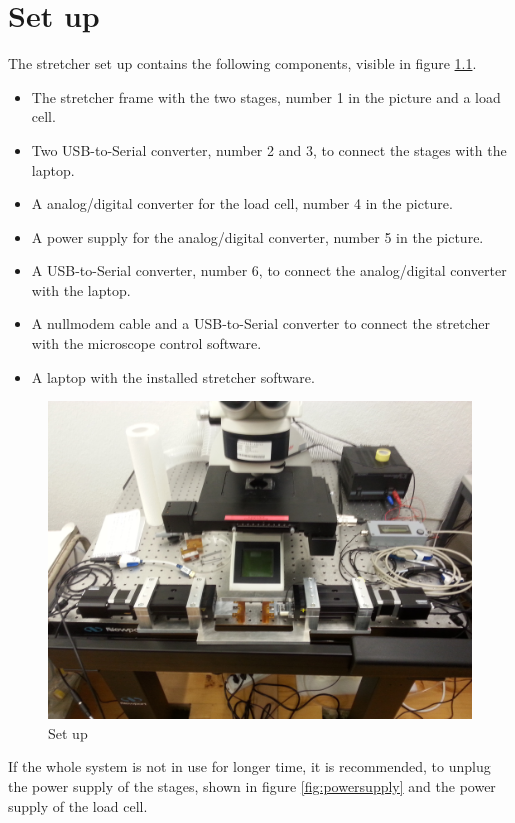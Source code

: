 \chapter{Set up}
The stretcher set up contains the following components, visible in figure \ref{fig:setup}.

\begin{itemize}
	\item The stretcher frame with the two stages, number 1 in the picture and a load cell.
	\item Two USB-to-Serial converter, number 2 and 3, to connect the stages with the laptop.
	\item A analog/digital converter for the load cell, number 4 in the picture.
	\item A power supply for the analog/digital converter, number 5 in the picture.
	\item A USB-to-Serial converter, number 6, to connect the analog/digital converter with the laptop.
	\item A nullmodem cable and a USB-to-Serial converter to connect the stretcher with the microscope control software.
	\item A laptop with the installed stretcher software.
\end{itemize}

\begin{figure}[!ht]
	\centering
		\includegraphics[width=1.0\textwidth]{images/SetUp}
	\caption{Set up}
	\label{fig:setup}
\end{figure}

If the whole system is not in use for longer time, it is recommended, to unplug the power supply of the stages, shown in figure \ref{fig:powersupply} and the power supply of the load cell.
\\

